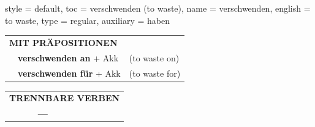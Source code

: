 \begin{verbentry}{
  style = {default},
  toc = {verschwenden (to waste)},
  name = {verschwenden},
  english = {to waste},
  type = {regular},
  auxiliary = {haben}
}
   \vspace{10pt}

   \begin{tabular}{lll}
      \multicolumn{3}{l}{\textbf{MIT PRÄPOSITIONEN}}\\
& \textbf{verschwenden an} + Akk & (to waste on)\\
& \textbf{verschwenden für} + Akk & (to waste for)\\
\end{tabular}
  \hfill
   \begin{tabular}{lll}
\multicolumn{3}{l}{\textbf{TRENNBARE VERBEN}}\\
& \textbf{---} & \\
\end{tabular}

  \vspace{-5pt}
\end{verbentry}

